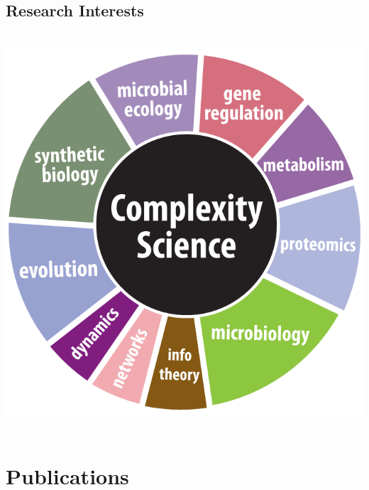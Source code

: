 \documentclass[usenames,dvipsnames]{friggeri-cv}
\begin{document}
\begin{aside}
   \section{Research Interests}
     ~
   \includegraphics[scale=0.6]{img/interests.png}
    ~
    ~
    ~
    ~
    ~
    ~
    ~
    ~
    ~
    ~
    ~
    ~
    ~
    ~
    ~
\end{aside}

\section{Publications}
\end{document}
